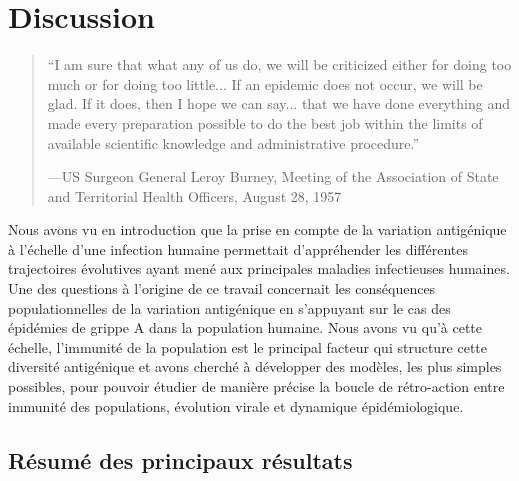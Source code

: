 
\chapter{Discussion}

\begin{quote}
  “I am sure that what any of us do, we will be criticized either for
  doing too much or for doing too little... If an epidemic does not
  occur, we will be glad. If it does, then I hope we can say... that we
  have done everything and made every preparation possible to do the
  best job within the limits of available scientific knowledge and
  administrative procedure.”

  —US Surgeon General Leroy Burney, Meeting of the Association of
  State and Territorial Health Officers, August 28, 1957
\end{quote}

\vspace{2cm}

Nous avons vu en introduction que la prise en compte de la variation
antigénique à l'échelle d'une infection humaine permettait
d'appréhender les différentes trajectoires évolutives ayant mené aux
principales maladies infectieuses humaines. Une des questions à
l'origine de ce travail concernait les conséquences populationnelles
de la variation antigénique en s'appuyant sur le cas des épidémies de
grippe A dans la population humaine. Nous avons vu qu'à cette échelle,
l'immunité de la population est le principal facteur qui structure
cette diversité antigénique et avons cherché à développer des modèles,
les plus simples possibles, pour pouvoir étudier de manière précise la
boucle de rétro-action entre immunité des populations, évolution
virale et dynamique épidémiologique.


\section{Résumé des principaux résultats}

